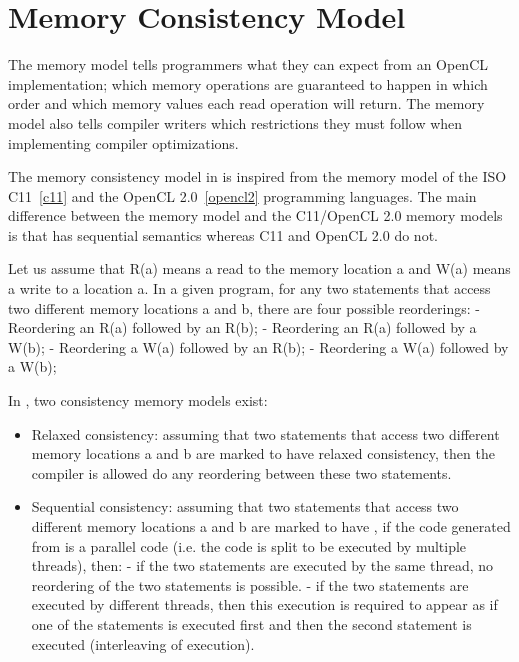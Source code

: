 \section{Memory Consistency Model}

The \pencil memory model tells programmers what they can expect from an OpenCL
implementation; which memory operations are guaranteed to happen in which order
and which memory values each read operation will return.
The memory model also tells compiler writers which restrictions they must follow
when implementing compiler optimizations.

The memory consistency model in \pencil is inspired from the memory model of
the ISO C11~\ref{c11} and the OpenCL 2.0~\ref{opencl2} programming languages.
The main difference between the \pencil memory model and the C11/OpenCL 2.0
memory models is that \pencil has sequential semantics whereas C11 and OpenCL
2.0 do not.

Let us assume that R(a) means a read to the memory location a and W(a) means
a write to a location a.
In a given program, for any two statements that access two different memory
locations a and b, there are four possible reorderings:
- Reordering an R(a) followed by an R(b);
- Reordering an R(a) followed by a  W(b);
- Reordering a  W(a) followed by an R(b);
- Reordering a  W(a) followed by a  W(b);

In \pencil, two consistency memory models exist:
\begin{itemize}
  \item Relaxed consistency: assuming that two statements that access two
  different memory locations a and b are marked to have relaxed consistency,
  then the compiler is allowed do any reordering between these
  two statements.
  \item Sequential consistency: assuming that two statements that access two
  different memory locations a and b are marked to have , if the code generated from \pencil is a parallel code
  (i.e. the code is split to be executed by multiple threads), then:
 	- if the two statements are executed by the same thread,
 	no reordering of the two statements is possible.
  	- if the two statements are executed by different threads, then this
  	execution is required to appear as if one of the statements is executed
  	first and then the second statement is executed (interleaving
  	of execution).
\end{itemize}

